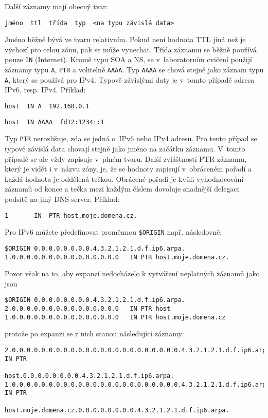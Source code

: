 Další záznamy mají obecný tvar:
\begin{verbatim}
jméno  ttl  třída  typ  <na typu závislá data>
\end{verbatim}
Jméno běžně bývá ve tvaru relativním. Pokud není hodnota TTL jiná než je výchozí pro celou zónu, pak se může vynechat. Třída záznamu se běžně používá pouze {\tt IN} (Internet). Kromě typu SOA a NS, se v~laboratorním cvičení použijí záznamy typu {\tt A}, {\tt PTR} a volitelně {\tt AAAA}. Typ {\tt AAAA} se chová stejně jako záznam typu {\tt A}, který se používá pro IPv4. Typově závislými daty je v~tomto případě adresa IPv6, resp. IPv4. Příklad:
\begin{verbatim}
host  IN A  192.168.0.1
\end{verbatim}
\begin{verbatim}
host  IN AAAA  fd12:1234::1
\end{verbatim}
Typ {\tt PTR} nerozlišuje, zda se jedná o~IPv6 nebo IPv4 adresu. Pro tento případ se typově závislá data chovají stejně jako jméno na začátku záznamu. V~tomto případě se ale vždy zapisuje v~plném tvaru. Další zvláštností PTR záznamu, který je vidět i v~názvu zóny, je, že se hodnoty zapisují v~obráceném pořadí a každá hodnota je oddělená tečkou. Obrácené pořadí je kvůli vyhodnocování záznamů od konce a tečka mezi každým číslem dovoluje snadnější delegaci podsítě na jiný DNS server. Příklad:
\begin{verbatim}
1		IN	PTR	host.moje.domena.cz.
\end{verbatim}

Pro IPv6 můžete předefinovat proměnnou {\tt \$ORIGIN} např. následovně:
\begin{verbatim}
$ORIGIN 0.0.0.0.0.0.0.0.4.3.2.1.2.1.d.f.ip6.arpa.
1.0.0.0.0.0.0.0.0.0.0.0.0.0.0.0   IN PTR host.moje.domena.cz.
\end{verbatim}
Pozor však na to, aby expanzí nedocházelo k vytváření neplatných záznamů jako jsou
\begin{verbatim}
$ORIGIN 0.0.0.0.0.0.0.0.4.3.2.1.2.1.d.f.ip6.arpa.
2.0.0.0.0.0.0.0.0.0.0.0.0.0.0.0   IN PTR host
1.0.0.0.0.0.0.0.0.0.0.0.0.0.0.0   IN PTR host.moje.domena.cz
\end{verbatim}
protože po expanzi se z nich stanou následující záznamy:
{\small
\begin{verbatim}
2.0.0.0.0.0.0.0.0.0.0.0.0.0.0.0.0.0.0.0.0.0.0.0.4.3.2.1.2.1.d.f.ip6.arpa. IN PTR
                                              host.0.0.0.0.0.0.0.0.4.3.2.1.2.1.d.f.ip6.arpa.
1.0.0.0.0.0.0.0.0.0.0.0.0.0.0.0.0.0.0.0.0.0.0.0.4.3.2.1.2.1.d.f.ip6.arpa. IN PTR
                               host.moje.domena.cz.0.0.0.0.0.0.0.0.4.3.2.1.2.1.d.f.ip6.arpa.
\end{verbatim}}

